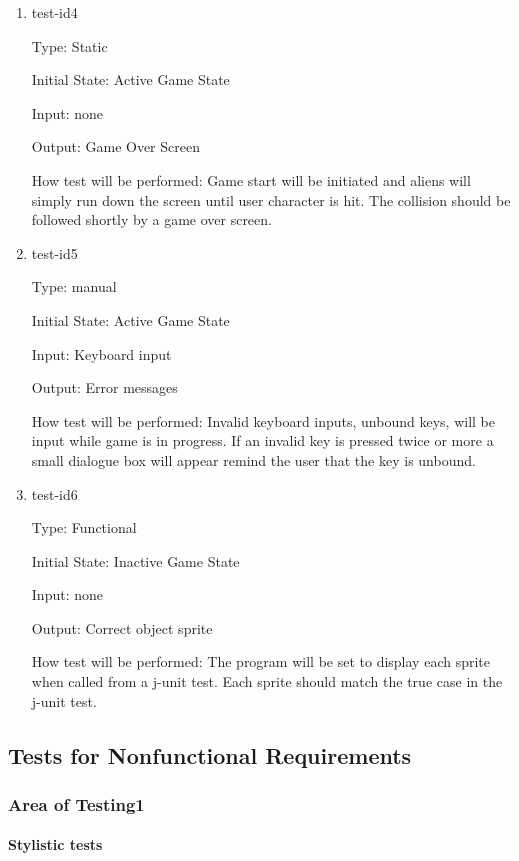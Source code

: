 \documentclass[12pt, titlepage]{article}
\begin{document}
\begin{enumerate}
\item{test-id4\\}

Type: Static

Initial State: Active Game State 

Input: none

Output: Game Over Screen 

How test will be performed: Game start will be initiated and aliens will simply run down the screen until user character is hit. The collision should be followed shortly by a game over screen. 

\item{test-id5\\}

Type: manual

Initial State: Active Game State 

Input: Keyboard input

Output: Error messages

How test will be performed: Invalid keyboard inputs, unbound keys, will be input while game is in progress. If an invalid key is pressed twice or more a small dialogue box will appear remind the user that the key is unbound. 

\item{test-id6\\}

Type: Functional 

Initial State: Inactive Game State

Input: none

Output: Correct object sprite

How test will be performed: The program will be set to display each sprite when called from a j-unit test. Each sprite should match the true case in the j-unit test. 

\end{enumerate}

\subsection{Tests for Nonfunctional Requirements}

\subsubsection{Area of Testing1}
		
\paragraph{Stylistic tests}
\end{document}
